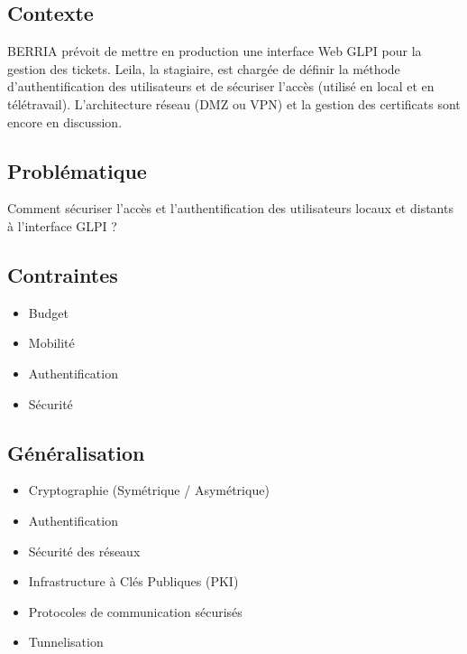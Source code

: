 \subsection*{Contexte}
{}
BERRIA prévoit de mettre en production une interface Web GLPI pour la gestion des tickets. Leila, la stagiaire, est chargée de définir la méthode d'authentification des utilisateurs et de sécuriser l'accès (utilisé en local et en télétravail). L'architecture réseau (DMZ ou VPN) et la gestion des certificats sont encore en discussion.

\subsection*{Problématique}
{}
Comment sécuriser l'accès et l'authentification des utilisateurs locaux et distants à l'interface GLPI ?

\newpage

\subsection*{Contraintes}
{}
\begin{itemize}
  \item Budget
  \item Mobilité
  \item Authentification
  \item Sécurité
\end{itemize}

\subsection*{Généralisation}
{}
\begin{itemize}
  \item Cryptographie (Symétrique / Asymétrique)
  \item Authentification
  \item Sécurité des réseaux
  \item Infrastructure à Clés Publiques (PKI)
  \item Protocoles de communication sécurisés
  \item Tunnelisation

\end{itemize}


